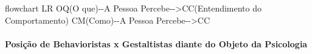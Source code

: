 \documentclass[
]{book}
\newenvironment{Shaded}{\begin{snugshade}}{\end{snugshade}}
\newcommand{\NormalTok}[1]{#1}
\begin{document}
\begin{Shaded}
\begin{Highlighting}[]
\NormalTok{flowchart LR}
\NormalTok{OQ(O que){-}{-}A Pessoa Percebe{-}{-}\textgreater{}CC(Entendimento do Comportamento)}
\NormalTok{CM(Como){-}{-}A Pessoa Percebe{-}{-}\textgreater{}CC}
\end{Highlighting}
\end{Shaded}

\hypertarget{posiuxe7uxe3o-de-behavioristas-x-gestaltistas-diante-do-objeto-da-psicologia}{%
\paragraph{Posição de Behavioristas x Gestaltistas diante do Objeto da
Psicologia}\label{posiuxe7uxe3o-de-behavioristas-x-gestaltistas-diante-do-objeto-da-psicologia}}
\end{document}
